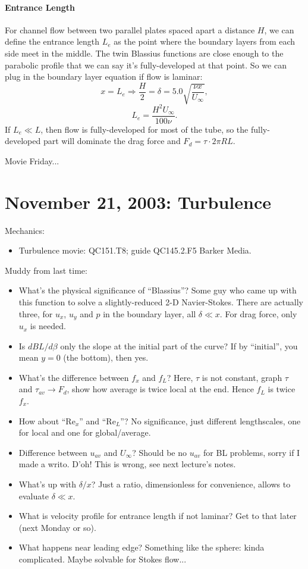 \documentclass{report}
\begin{document}
\paragraph{Entrance Length}

For channel flow between two parallel plates spaced apart a distance $H$, we
can define the entrance length $L_e$ as the point where the boundary layers
from each side meet in the middle.  The twin Blassius functions are close
enough to the parabolic profile that we can say it's fully-developed at that
point.  So we can plug in the boundary layer equation if flow is laminar:
$$x=L_e \Rightarrow \frac{H}{2} = \delta = 5.0\sqrt{\frac{\nu x}{U_\infty}},$$
$$L_e = \frac{H^2U_\infty}{100\nu}.$$
If $L_e\ll L$, then flow is fully-developed for most of the tube, so the
fully-developed part will dominate the drag force and $F_d=\tau\cdot2\pi RL$.

Movie Friday...
\newpage


\section{November 21, 2003: Turbulence}

Mechanics:
\begin{itemize}
\item Turbulence movie: QC151.T8; guide QC145.2.F5 Barker Media.
\end{itemize}

\noindent Muddy from last time:
\begin{itemize}
\item What's the physical significance of ``Blassius''?  Some guy who came up
  with this function to solve a slightly-reduced 2-D Navier-Stokes.  There are
  actually three, for $u_x$, $u_y$ and $p$ in the boundary layer, all
  $\delta\ll x$.  For drag force, only $u_x$ is needed.
\item Is $dBL/d\beta$ only the slope at the initial part of the curve?  If by
  ``initial'', you mean $y=0$ (the bottom), then yes.
\item What's the difference between $f_x$ and $f_L$?  Here, $\tau$ is not
  constant, graph $\tau$ and $\tau_{av}\rightarrow F_d$, show how average is
  twice local at the end.  Hence $f_L$ is twice $f_x$.
\item How about ``Re$_x$'' and ``Re$_L$''?  No significance, just different
  lengthscales, one for local and one for global/average.
\item Difference between $u_{av}$ and $U_\infty$?  Should be no $u_{av}$ for BL
  problems, sorry if I made a writo.  D'oh!  This is wrong, see next lecture's
  notes.
\item What's up with $\delta/x$?  Just a ratio, dimensionless for convenience,
  allows to evaluate $\delta\ll x$.
\item What is velocity profile for entrance length if not laminar?  Get to that
  later (next Monday or so).
\item What happens near leading edge?  Something like the sphere: kinda
  complicated.  Maybe solvable for Stokes flow...
\end{itemize}
\end{document}

